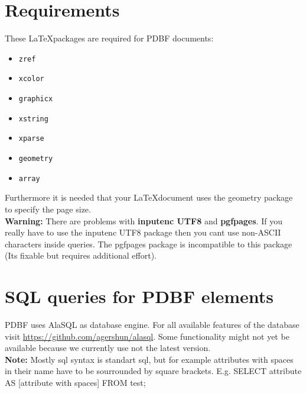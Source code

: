 \documentclass[11pt]{article}
\begin{document}
\section{Requirements}
These \LaTeX\relax packages are required for PDBF documents:
\begin{itemize}
\item \verb|zref|
\item \verb|xcolor|
\item \verb|graphicx|
\item \verb|xstring|
\item \verb|xparse|
\item \verb|geometry|
\item \verb|array|
\end{itemize}
\noindent Furthermore it is needed that your \LaTeX\relax document uses the geometry package to specify the page size.\\

\noindent \textbf{Warning:} There are problems with \textbf{inputenc UTF8} and \textbf{pgfpages}. If you really have to use the inputenc UTF8 package then you cant use non-ASCII characters inside queries. The pgfpages package is incompatible to this package (Its fixable but requires additional effort). 

\section{SQL queries for PDBF elements}
PDBF uses AlaSQL as database engine. For all available features of the database visit \url{https://github.com/agershun/alasql}. Some functionality might not yet be available because we currently use not the latest version.\\[4pt]
\textbf{Note:} Mostly sql syntax is standart sql, but for example attributes with spaces in their name have to be sourrounded by square brackets. E.g. SELECT attribute AS [attribute with spaces] FROM test;\\
\end{document}
